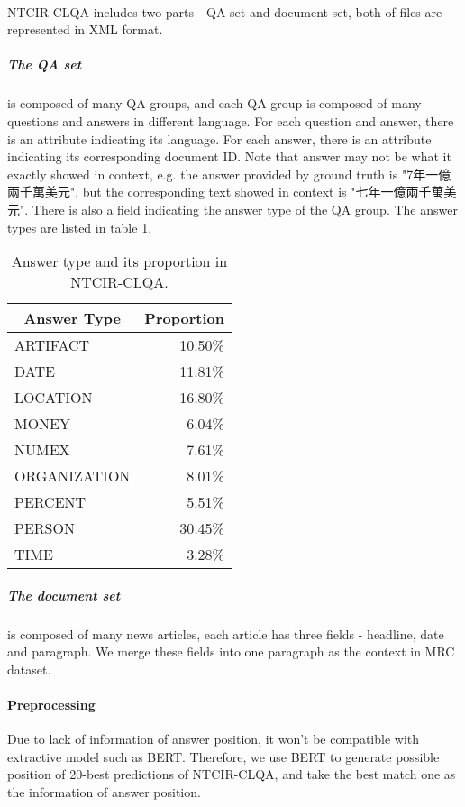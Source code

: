 \documentclass{article}
\begin{document}
\paragraph{}
NTCIR-CLQA includes two parts - QA set and document set, both of files are represented in XML format.

\begin{CJK*}{UTF8}{bsmi}
\subparagraph{The QA set} is composed of many QA groups, and each QA group is composed of many questions and answers in different language. For each question and answer, there is an attribute indicating its language. For each answer, there is an attribute indicating its corresponding document ID. Note that answer may not be what it exactly showed in context, e.g. the answer provided by ground truth is "7年一億兩千萬美元", but the corresponding text showed in context is "七年一億兩千萬美元". There is also a field indicating the answer type of the QA group. The answer types are listed in table \ref{tab:answer-types}.
\end{CJK*}

\begin{table}[ht!]
  \centering
  \begin{tabular}{lr}
    \multicolumn{1}{c}{Answer Type} & \multicolumn{1}{c}{Proportion} \\
    \toprule
    ARTIFACT & 10.50\% \\
    DATE & 11.81\% \\
    LOCATION & 16.80\% \\
    MONEY & 6.04\% \\
    NUMEX & 7.61\% \\
    ORGANIZATION & 8.01\% \\
    PERCENT & 5.51\% \\
    PERSON & 30.45\% \\
    TIME & 3.28\%
  \end{tabular}
  \caption{Answer type and its proportion in NTCIR-CLQA.}
  \label{tab:answer-types}
\end{table}

\subparagraph{The document set} is composed of many news articles, each article has three fields - headline, date and paragraph. We merge these fields into one paragraph as the context in MRC dataset.

\paragraph{Preprocessing}
Due to lack of information of answer position, it won't be compatible with extractive model such as BERT. Therefore, we use BERT to generate possible position of 20-best predictions of NTCIR-CLQA, and take the best match one as the information of answer position.
\end{document}
